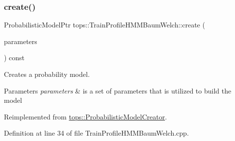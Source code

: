 \subsubsection{\texorpdfstring{create()}{create()}}
{\footnotesize\ttfamily Probabilistic\+Model\+Ptr tops\+::\+Train\+Profile\+H\+M\+M\+Baum\+Welch\+::create (\begin{DoxyParamCaption}\item[{\hyperlink{classtops_1_1ProbabilisticModelParameters}{Probabilistic\+Model\+Parameters} \&}]{parameters }\end{DoxyParamCaption}) const\hspace{0.3cm}{\ttfamily [virtual]}}



Creates a probability model. 


\begin{DoxyParams}{Parameters}
{\em parameters} & is a set of parameters that is utilized to build the model \\
\hline
\end{DoxyParams}


Reimplemented from \hyperlink{classtops_1_1ProbabilisticModelCreator_afed6c8ffa45fff446bdaa8b533da8f7c}{tops\+::\+Probabilistic\+Model\+Creator}.



Definition at line 34 of file Train\+Profile\+H\+M\+M\+Baum\+Welch.\+cpp.


